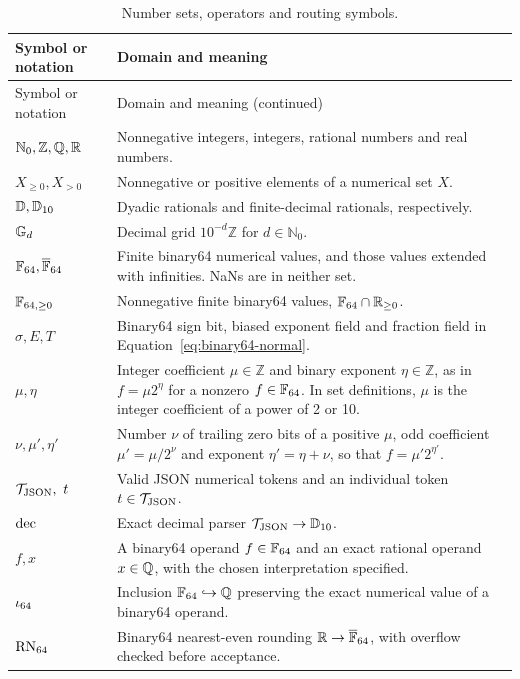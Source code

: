 \begingroup
\small
\begin{longtable}{@{}>{\raggedright\arraybackslash}p{4cm}>{\raggedright\arraybackslash}p{12cm}@{}}
\caption{Number sets, operators and routing symbols.}\label{tab:notation}\\
\toprule
Symbol or notation & Domain and meaning\\
\midrule
\endfirsthead
\toprule
Symbol or notation & Domain and meaning (continued)\\
\midrule
\endhead
\bottomrule
\endfoot
$\mathbb{N}_0,\mathbb{Z},\mathbb{Q},\mathbb{R}$ & Nonnegative integers, integers, rational numbers and real numbers.\\
$X_{\geq0},X_{>0}$ & Nonnegative or positive elements of a numerical set $X$.\\
$\mathbb{D},\mathbb{D}_{10}$ & Dyadic rationals and finite-decimal rationals, respectively.\\
$\mathbb{G}_{d}$ & Decimal grid $10^{-d}\mathbb{Z}$ for $d\in\mathbb{N}_0$.\\
$\mathbb{F}_{64},\overline{\mathbb{F}}_{64}$ & Finite binary64 numerical values, and those values extended with infinities. NaNs are in neither set.\\
$\mathbb{F}_{64,\geq0}$ & Nonnegative finite binary64 values, $\mathbb{F}_{64}\cap\mathbb{R}_{\geq0}$.\\
$\sigma,E,T$ & Binary64 sign bit, biased exponent field and fraction field in Equation~\ref{eq:binary64-normal}.\\
$\mu,\eta$ & Integer coefficient $\mu\in\mathbb{Z}$ and binary exponent $\eta\in\mathbb{Z}$, as in $f=\mu2^{\eta}$ for a nonzero $f\in\mathbb{F}_{64}$. In set definitions, $\mu$ is the integer coefficient of a power of 2 or 10.\\
$\nu,\mu',\eta'$ & Number $\nu$ of trailing zero bits of a positive $\mu$, odd coefficient $\mu'=\mu/2^{\nu}$ and exponent $\eta'=\eta+\nu$, so that $f=\mu'2^{\eta'}$.\\
$\JsonNum,\ t$ & Valid JSON numerical tokens and an individual token $t\in\mathcal{T}_{\mathrm{JSON}}$.\\
$\operatorname{dec}$ & Exact decimal parser $\mathcal{T}_{\mathrm{JSON}}\to\mathbb{D}_{10}$.\\
$f,x$ & A binary64 operand $f\in\mathbb{F}_{64}$ and an exact rational operand $x\in\mathbb{Q}$, with the chosen interpretation specified.\\
$\iota_{64}$ & Inclusion $\mathbb{F}_{64}\hookrightarrow\mathbb{Q}$ preserving the exact numerical value of a binary64 operand.\\
$\operatorname{RN}_{64}$ & Binary64 nearest-even rounding $\mathbb{R}\to\overline{\mathbb{F}}_{64}$, with overflow checked before acceptance.\\

\end{longtable}
